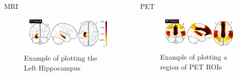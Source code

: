 \documentclass[final]{beamer}
\newlength{\onecolwid}
\newlength{\twocolwid}
\begin{document}
\begin{frame}[t]
\begin{columns}[t]
\begin{column}{\twocolwid}
\begin{columns}[t,totalwidth=\twocolwid]
\begin{column}{\onecolwid}
\begin{block}{MRI}
            \begin{figure}
                \includegraphics[width=1.0\linewidth]{images/hippo.png}
                \caption{Example of plotting the Left Hippocampus}
            \end{figure}
            \end{block}
            
        
        \end{column} %
        
        \begin{column}{\onecolwid} %
        
            
            \begin{block}{PET}
            
                
                \begin{figure}
                    \includegraphics[width=1.0\linewidth]{images/petROI.png}
                    \caption{Example of plotting a region of PET ROIs}
                \end{figure}


\end{block}
\end{column}
\end{columns}
\end{column}
\end{columns}
\end{frame}
\end{document}
